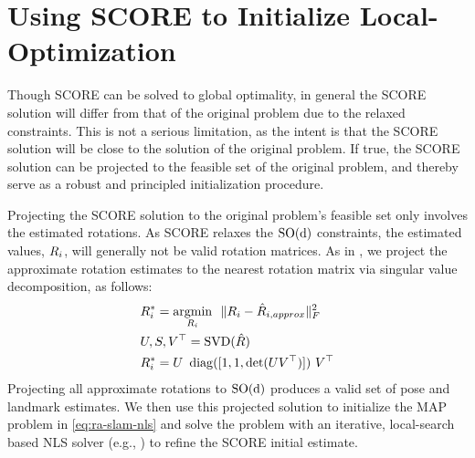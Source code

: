 \section{Using SCORE to Initialize Local-Optimization}
\label{sec:score-to-initialize}

Though SCORE can be solved to global optimality, in general the SCORE solution
will differ from that of the original problem due to the relaxed constraints.
This is not a serious limitation, as the intent is that the SCORE solution will
be close to the solution of the original problem. If true, the SCORE solution
can be projected to the feasible set of the original problem, and thereby serve
as a robust and principled initialization procedure.

Projecting the SCORE solution to the original problem's feasible set only
involves the estimated rotations. As SCORE relaxes the $\operatorname{{\operatorname{SO}}(d)}$ constraints, the
estimated values, $R_i$, will generally not be valid rotation matrices. As in
\cite{martinec07cvpr}, we project the approximate rotation estimates to the
nearest rotation matrix via singular value decomposition, as follows:
\begin{align}
    & {R}^{*}_i = \operatorname*{argmin}_{R_i}~~\lVert R_i - \hat{R}_{i,approx} \rVert_F^2 \label{eq:single-rotation-frob} \\
    & U,S,V^\top = \operatorname*{SVD}(\hat{R}) \label{eq:SVD} \\
    & {R}^{*}_i = U ~ \operatorname{diag}([1, 1, \det(U V^\top)]) ~ V^\top \label{eq:SOd-projection}
\end{align}
Projecting all approximate rotations to $\operatorname{{\operatorname{SO}}(d)}$ produces a valid set of pose and
landmark estimates. We then use this projected solution to initialize the MAP
problem in \cref{eq:ra-slam-nls} and solve the problem with an iterative,
local-search based NLS solver (e.g., \cite{dellaert2012techreport}) to refine
the SCORE initial estimate.